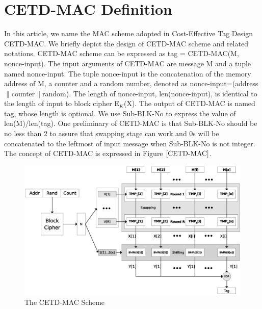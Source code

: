 \documentclass{article}
\begin{document}
\section{CETD-MAC Definition}
In this article, we name the MAC scheme adopted in Cost-Effective Tag Design\cite{} CETD-MAC. We briefly depict the design of CETD-MAC scheme and related notations.
CETD-MAC scheme can be expressed as tag = CETD-MAC(M, nonce-input). The input arguments of CETD-MAC are message M and a tuple named nonce-input. The tuple nonce-input is the concatenation of the memory address of M, a counter and a random number, denoted as nonce-input=(address$\|$counter$\|$random). The length of nonce-input, len(nonce-input), is identical to the length of input to block cipher E$_K$(X). The output of CETD-MAC is named tag, whose length is optional. We use Sub-BLK-No to express the value of len(M)/len(tag). One preliminary of CETD-MAC is that Sub-BLK-No should be no less than 2 to assure that swapping stage can work and 0s will be concatenated to the leftmost of input message when Sub-BLK-No is not integer.  
The concept of CETD-MAC is expressed in Figure $\ref{CETD-MAC}$.
\begin{figure}[htbp]
 \centering
 \includegraphics[scale=0.6]{./diagrams/CETD.eps}
 \caption{The CETD-MAC Scheme}
 \label{fig:CETD-MAC}
\end{figure}
\end{document}
